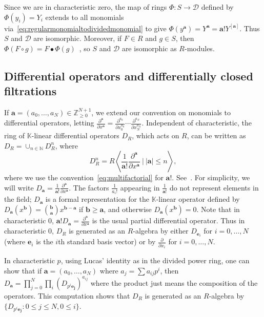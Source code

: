 \documentclass[12pt, reqno]{amsart}
\numberwithin{equation}{section}
\newcommand{\ba}{\mathbf{a}}
\newcommand{\bb}{\mathbf{b}}
\newcommand{\be}{\mathbf{e}}
\newcommand{\Z}{{\mathbb Z}}
\newcommand{\kk}{\mathbb{K}}
\newcommand{\contract}{\bullet}
\theoremstyle{plain} %
\theoremstyle{definition}
\theoremstyle{remark}
\begin{document}
Since we are in characteristic zero, the map of rings $\Phi:S\to\mathcal{D}$ defined by $\Phi(y_i)=Y_i$ extends to all monomials via~\eqref{eq:regularmonomialtodividedmonomial} to give $\Phi(y^\mathbf{a})=Y^{\mathbf{a}}=\mathbf{a}! Y^{[\mathbf{a}]}$.  Thus $S$ and $\mathcal{D}$ are isomorphic.  Moreover, if $F\in R$ and $g\in S$, then $\Phi(F\circ g)=F\contract\Phi(g)$~\cite[Theorem~9.5]{Ger95}, so $S$ and $\mathcal{D}$ are isomorphic as $R$-modules.

\subsection{Differential operators and differentially closed filtrations}
If $\ba=(a_0,\ldots,a_N)\in\Z^{N+1}_{\ge 0}$, we extend our convention on monomials to differential operators,  letting $\frac{\partial^{\ba}}{\partial x^\ba}=\frac{\partial^{a_0}}{\partial x_0^{a_0}} \cdots \frac{\partial^{a_N}}{\partial x_N^{a_N}}$.  Independent of characteristic, the ring of $\kk$-linear differential operators $D_R$, which acts on $R$, can be written as $D_R=\cup_{n\in \mathbb{N}}D^n_R$, where
\[
D^n_R=R \left< \frac{1}{\ba!} \frac{\partial^\ba}{\partial x^{\ba}} ~\Big|~ |\ba| \leq n \right>,
\]
where we use the convention~\eqref{eq:multifactorial} for $\ba!$.  See~\cite[Remark~2.7]{DDSGHN2018}.  For simplicity, we will write $D_{\ba} = \frac{1}{\ba!} \frac{\partial^{\ba}}{\partial x^\ba}$. The factors $\frac{1}{a_i!}$ appearing in $\frac{1}{\ba!}$ do not represent elements in the field; $D_{\ba}$ is a formal representation for the $\kk$-linear operator defined by $D_{\ba}(x^\bb) = {\bb \choose \ba} x^{\bb-\ba}$ if $\bb\geq \ba$, and otherwise $D_{\ba}(x^\bb) = 0$. Note that in characteristic $0$, $\ba! D_{\ba}=  \frac{\partial^{\ba}}{\partial x^{\ba}}$ is the usual partial differential operator.  Thus in characteristic $0$, $D_R$ is generated as an $R$-algebra by either $D_{\be_i}$ for $i=0,\ldots,N$ (where $\be_i$ is the $i$th standard basis vector) or by $\frac{\partial}{\partial x_i}$ for $i=0,\ldots,N$.

In characteristic $p$, using Lucas' identity as in the divided power ring, one can show that if $\ba = (a_0,\ldots ,a_N)$ where $a_j = \sum a_{ij}p^i$, then $D_\ba = \prod_{j=0}^N \prod_i (D_{p^i\mathbf{e_j}})^{a _{ij}}$ where the product just means the composition of the operators.  This computation shows that $D_R$ is generated as an $R$-algebra by $\{D_{p^i\mathbf{e_j}}: 0\leq j\leq N, 0\le i\}$.
\end{document}
